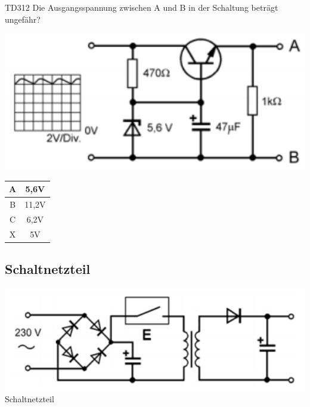 \begin{frame}
    \begin{center} \Large
        \begin{block}{TD312}
		\large Die Ausgangsspannung zwischen A und B in der Schaltung beträgt ungefähr?\\
		\begin{center}
		\includegraphics[width=1\textwidth]{a17/TD312.png}\\
		\end{center}
    	\end{block}
        \begin{tabular}{|c|c|}
        \hline
        A & 5,6V \\ \hline
        B & 11,2V \\ \hline
        C & 6,2V \\ \hline
        X & 5V \\ \hline
        \end{tabular}
    \end{center}
\end{frame}

\subsection*{Schaltnetzteil}
\begin{frame}
    \begin{center}
        \includegraphics[width=1\textwidth]{a17/TD317.png}\\
       Schaltnetzteil \cite{bna}
    \end{center}
\end{frame}

